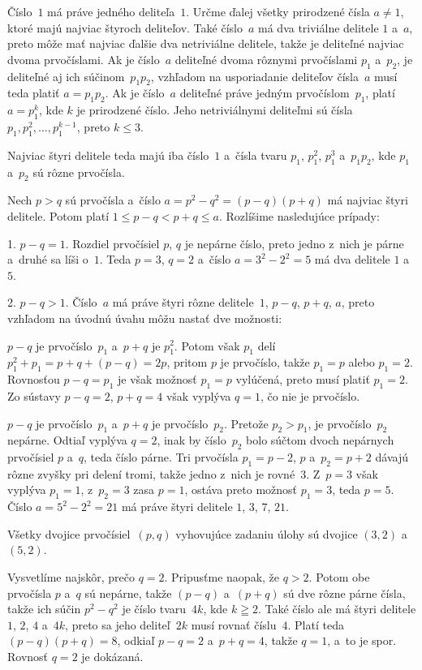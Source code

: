 {%
Číslo~$1$ má práve jedného deliteľa~$1$. Určme ďalej všetky
prirodzené čísla $a\ne1$, ktoré majú najviac štyroch deliteľov.
Také číslo~$a$ má dva triviálne delitele $1$ a~$a$, preto môže
mať najviac ďalšie dva netriviálne delitele, takže je deliteľné
najviac dvoma prvočíslami. Ak je číslo~$a$ deliteľné dvoma rôznymi
prvočíslami $p_1$ a~$p_2$, je deliteľné aj ich súčinom~$p_1p_2$,
vzhľadom na usporiadanie deliteľov čísla~$a$ musí teda platiť
$a=p_1p_2$. Ak je číslo~$a$ deliteľné práve jedným prvočíslom~$p_1$,
platí $a=p_1^k$, kde $k$ je prirodzené číslo. Jeho
netriviálnymi deliteľmi sú čísla $p_1,p_1^2,\dots,p_1^{k-1}$,
preto $k\leq3$.

Najviac štyri delitele teda majú iba číslo~$1$ a~čísla tvaru
$p_1$, $p_1^2$, $p_1^3$ a~$p_1p_2$, kde $p_1$ a~$p_2$ sú rôzne
prvočísla.

Nech $p>q$ sú prvočísla a~číslo $a=p^2-q^2=(p-q)(p+q)$ má najviac
štyri delitele. Potom platí $1\leq p-q<p+q\leq a$. Rozlíšime
nasledujúce prípady:

\item{1.} $p-q=1$. Rozdiel prvočísiel $p$, $q$ je nepárne číslo, preto
jedno z~nich je párne a~druhé sa líši o~$1$. Teda $p=3$, $q=2$
a~číslo $a=3^2-2^2=5$ má dva delitele $1$ a~$5$.

\item{2.} $p-q>1$. Číslo~$a$ má práve štyri rôzne delitele~$1$,
$p-q$, $p+q$, $a$, preto vzhľadom na úvodnú úvahu môžu nastať dve
možnosti:

$p-q$ je prvočíslo~$p_1$ a~$p+q$ je $p_1^2$. Potom však $p_1$ delí
$p_1^2+p_1=p+q+(p-q)=2p$, pritom $p$ je prvočíslo, takže $p_1=p$
alebo $p_1=2$. Rovnosťou $p-q=p_1$ je však možnosť $p_1=p$
vylúčená, preto musí platiť $p_1=2$. Zo sústavy $p-q=2$,
$p+q=4$ však vyplýva $q=1$, čo nie je prvočíslo.

$p-q$ je prvočíslo~$p_1$ a~$p+q$ je prvočíslo~$p_2$. Pretože
$p_2>p_1$, je prvočíslo~$p_2$ nepárne. Odtiaľ vyplýva $q=2$, inak by
číslo~$p_2$ bolo súčtom dvoch nepárnych prvočísiel $p$ a~$q$, teda
číslo párne. Tri prvočísla $p_1=p-2$, $p$ a~$p_2=p+2$ dávajú rôzne
zvyšky pri delení tromi, takže jedno z~nich je rovné~$3$. Z~$p=3$
však vyplýva $p_1=1$, z~$p_2=3$ zasa $p=1$, ostáva preto možnosť
$p_1=3$, teda $p=5$. Číslo $a=5^2-2^2=21$ má práve štyri
delitele $1$, $3$, $7$, $21$.

Všetky dvojice prvočísiel~$(p,q)$ vyhovujúce zadaniu úlohy sú
dvojice $(3,2)$ a~$(5,2)$.

\ineriesenie
Vysvetlíme najskôr, prečo $q=2$. Pripusťme naopak, že $q>2$. Potom
obe prvočísla $p$ a~$q$ sú nepárne, takže $(p-q)$ a~$(p+q)$ sú
dve rôzne párne čísla, takže ich súčin $p^2-q^2$ je číslo
tvaru~$4k$, kde $k\geqq2$. Také číslo ale má štyri delitele
$1$, $2$, $4$ a~$4k$, preto sa jeho deliteľ~$2k$ musí rovnať
číslu~$4$. Platí teda $(p-q)(p+q)=8$, odkiaľ $p-q=2$ a~$p+q=4$,
takže $q=1$, a~to je spor. Rovnosť $q=2$ je dokázaná.

}
